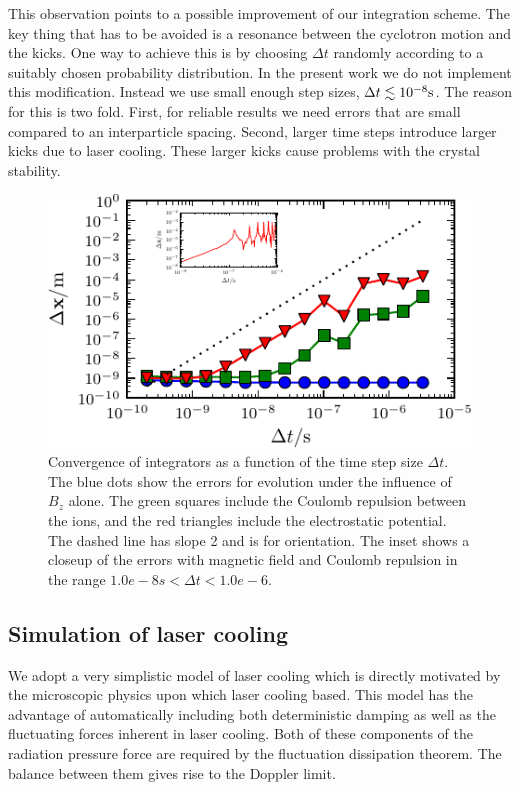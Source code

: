 \documentclass[
  aps,
  reprint,
  twoside,
  showpacs,
  amsmath,
  amssymb,
  floatfix
]{revtex4-1}
\begin{document}
This observation points to a possible improvement of our integration
scheme.  The key thing that has to be avoided is a resonance between the
cyclotron motion and the kicks.  One way to achieve this is by choosing
$\Delta t$ randomly according to a suitably chosen probability
distribution.  In the present work we do not implement this
modification.  Instead we use small enough step sizes, $\Delta t\lesssim
10^{-8}{\rm s}$.  The reason for this is two fold.  First, for reliable
results we need errors that are small compared to an interparticle
spacing.  Second, larger time steps introduce larger kicks due to laser
cooling.  These larger kicks cause problems with the crystal stability.

\begin{figure}
\includegraphics{figures/convergencePlot}
\caption{Convergence of integrators as a function of the time step size
  $\Delta t$.  The blue dots show the errors for evolution under the
    influence of $B_z$ alone.  The green squares include the Coulomb
    repulsion between the ions, and the red triangles include the
    electrostatic potential.  The dashed line has slope 2 and is for
    orientation.  The inset shows a closeup of the errors with magnetic
    field and Coulomb repulsion in the range $1.0e-8 s < \Delta t <
    1.0e-6$.}
\label{fig:convergencePlot}
\end{figure}


\subsection{Simulation of laser cooling}
\label{ssec:laserCooling}

We adopt a very simplistic model of laser cooling which is directly
motivated by the microscopic physics upon which laser cooling based.
This model has the advantage of automatically including both
deterministic damping as well as the fluctuating forces inherent in
laser cooling.  Both of these components of the radiation pressure force
are required by the fluctuation dissipation theorem.  The balance
between them gives rise to the Doppler limit.
\end{document}
